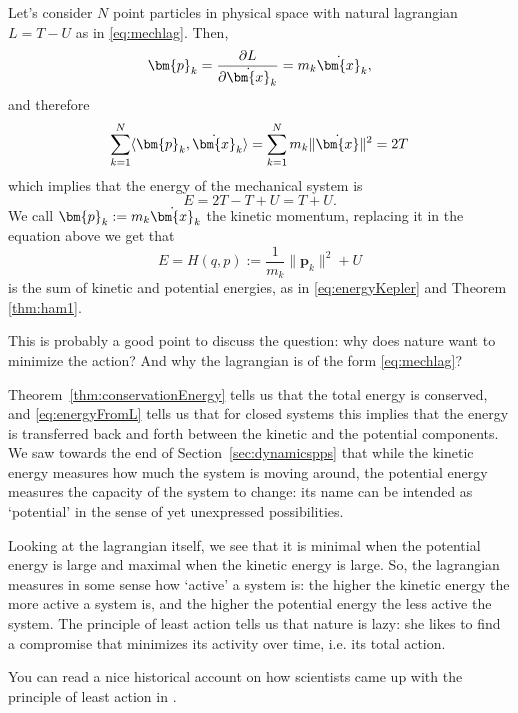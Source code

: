 \documentclass[english,fontsize=11pt,paper=a5,oneside]{scrbook}
\newcommand{\bx}{\bm{x}}
\newcommand{\bp}{\bm{p}}
\newcommand{\lag}{\langle}
\newcommand{\rag}{\rangle}
\theoremstyle{definition}
\newenvironment{remark}
  {\pushQED{\qed}\renewcommand{\qedsymbol}{$\lozenge$}\remarkx}
  {\popQED\endremarkx}
\newenvironment{example}
  {\pushQED{\qed}\renewcommand{\qedsymbol}{$\lozenge$}\examplex}
  {\popQED\endexamplex}
\begin{document}
\begin{example}\label{ex:natlagham}
    Let's consider $N$ point particles in physical space with natural lagrangian $L = T - U$ as in \eqref{eq:mechlag}.
    Then,
    \begin{equation}
        \bp_k = \frac{\partial L}{\partial \dot\bx_k} = m_k \dot \bx_k,
    \end{equation}
    and therefore
    \begin{equation}
        \sum_{k=1}^{N} \lag\bp_k, \dot\bx_k\rag = \sum_{k=1}^{N} m_k \|\dot\bx\|^2 = 2 T
    \end{equation}
    which implies that the energy of the mechanical system is
    \begin{equation}\label{eq:energyFromL}
        E = 2T - T + U = T + U.
    \end{equation}
    We call $\bp_k := m_k \dot \bx_k$ the kinetic momentum, replacing it in the equation above we get that
    \begin{equation}
        E = H(q,p) := \frac{1}{m_k}\|\bp_k\|^2 + U
    \end{equation}
    is the sum of kinetic and potential energies, as in \eqref{eq:energyKepler} and Theorem \ref{thm:ham1}.
\end{example}

\begin{remark}
    This is probably a good point to discuss the question: why does nature want to minimize the action? And why the lagrangian is of the form \eqref{eq:mechlag}?

    Theorem~\ref{thm:conservationEnergy} tells us that the total energy is conserved, and \eqref{eq:energyFromL} tells us that for closed systems this implies that the energy is transferred back and forth between the kinetic and the potential components.
    We saw towards the end of Section~\ref{sec:dynamicspps} that while the kinetic energy measures how much the system is moving around, the potential energy measures the capacity of the system to change: its name can be intended as `potential' in the sense of yet unexpressed possibilities.

    Looking at the lagrangian itself, we see that it is minimal when the potential energy is large and maximal when the kinetic energy is large.
    So, the lagrangian measures in some sense how `active' a system is: the higher the kinetic energy the more active a system is, and the higher the potential energy the less active the system.
    The principle of least action tells us that nature is lazy: she likes to find a compromise that minimizes its activity over time, i.e. its total action.

    You can read a nice historical account on how scientists came up with the principle of least action in \cite{lectures:baez}.
\end{remark}
\end{document}

